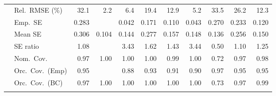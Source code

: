 \begin{landscape}
\begin{longtable}{llrrrrrrrrr}
 & Rel.\ RMSE (\%) & 32.1 & \cellcolor{rankone}2.2 & \cellcolor{rankthree}6.4 & 19.4 & 12.9 & \cellcolor{ranktwo}5.2 & 33.5 & 26.2 & 12.3 \\
 & Emp.\ SE & 0.283 &  & 0.042 & 0.171 & 0.110 & 0.043 & 0.270 & 0.233 & 0.120 \\
 & Mean SE & 0.306 & 0.104 & 0.144 & 0.277 & 0.157 & 0.148 & 0.136 & 0.256 & 0.150 \\
 & SE ratio & \cellcolor{rankone}1.08 &  & 3.43 & 1.62 & 1.43 & 3.44 & 0.50 & \cellcolor{ranktwo}1.10 & \cellcolor{rankthree}1.25 \\
 & Nom.\ Cov. & \cellcolor{rankone}0.97 & 1.00 & 1.00 & 1.00 & \cellcolor{rankthree}0.99 & 1.00 & 0.72 & \cellcolor{rankone}0.97 & \cellcolor{ranktwo}0.98 \\
 & Orc.\ Cov.\ (Emp) & \cellcolor{rankone}0.95 &  & 0.88 & \cellcolor{ranktwo}0.93 & \cellcolor{rankthree}0.91 & 0.90 & \cellcolor{ranktwo}0.97 & \cellcolor{rankone}0.95 & \cellcolor{rankone}0.95 \\
 & Orc.\ Cov.\ (BC) & \cellcolor{rankone}0.97 & \cellcolor{rankthree}1.00 & \cellcolor{rankthree}1.00 & \cellcolor{rankthree}1.00 & \cellcolor{rankthree}1.00 & \cellcolor{rankthree}1.00 & 0.73 & \cellcolor{rankone}0.97 & \cellcolor{ranktwo}0.99 \\
\addlinespace[2pt]
\end{longtable}
\end{landscape}

